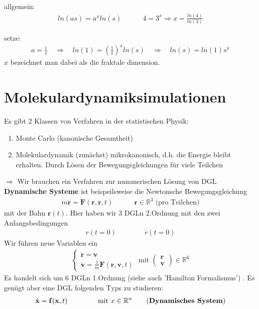 \documentclass[12pt]{article}
\begin{document}
allgemein: \begin{align*}
ln(as)= a^x ln(s) \quad \quad \quad   4=3^x \Rightarrow x= \frac{ln(4)}{ln(3)}
\end{align*}


setze:\begin{align*}
a= \frac{1}{s} \quad \Rightarrow \quad ln(1)= \left( \frac{1}{s} \right)^x ln(s) \quad \Rightarrow \quad ln(s)= ln(1) s^x
\end{align*} 
$x$ bezeichnet man dabei als die fraktale dimension.

\section{Molekulardynamiksimulationen}
Es gibt 2 Klassen von Verfahren in der statistischen Physik: 
\begin{enumerate}
\item Monte Carlo (kanonische Gesamtheit)
\item Molekulardynamik (zunächst) mikrokanonisch, d.h. die Energie bleibt erhalten. Durch Lösen der Bewegungsgleichungen für viele Teilchen \\
\end{enumerate}
$\Rightarrow$ Wir brauchen ein Verfahren zur nummerischen Lösung von DGL \\
\textbf{Dynamische Systeme} 
ist beispeilsweise die Newtonsche Bewegungsgleichung 
\begin{align}
m \ddot{\mathbf{r}} = \mathbf{F} (\mathbf{r}, \dot{\mathbf{r}}, t) \quad \quad \quad \mathbf{r} \in \mathbb{R}^3 \; \text{(pro Teilchen)}
\end{align} mit der Bahn $\mathbf{r}(t)$. Hier haben wir 3 DGLn $2.$Ordnung mit den zwei Anfangsbedingungen
\begin{align*}
r(t=0) \quad \quad  \quad \quad \dot{r}(t=0)
\end{align*}
Wir führen neue Variablen ein 
\begin{align*}
\begin{cases}
\dot{\mathbf{r}}= \mathbf{v} \\
\dot{\mathbf{v}} = \frac{1}{m} \mathbf{F}(\mathbf{r}, \mathbf{v},t) 
\end{cases}
\text{ mit }
\begin{pmatrix}\mathbf{r}\\ \mathbf{v}\end{pmatrix} \in \mathbb{R}^6
\end{align*}
Es handelt sich um 6 DGLn 1.Ordnung (siehe auch 'Hamilton Formalismus') %
. Es genügt aber eine DGL folgenden Typs zu studieren: 
\begin{align}
\dot{\mathbf{x}}= \mathbf{f}( \mathbf{x},t) \quad \quad \quad \quad \mbox{  mit  } x \in \mathbb{R}^n \tag{\textbf{Dynamisches System}}
\end{align}
\end{document}

